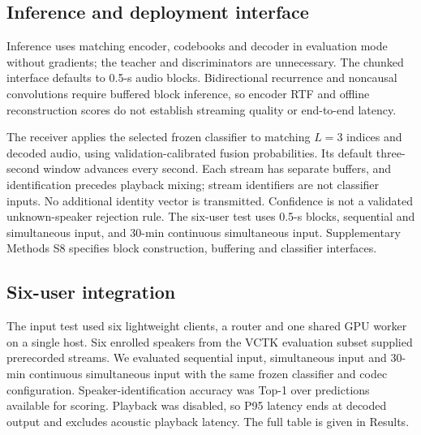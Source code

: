 \documentclass[final,5p,times,twocolumn]{elsarticle}
\begin{document}
\subsection{Inference and deployment interface}
Inference uses matching encoder, codebooks and decoder in evaluation mode without gradients; the teacher and discriminators are unnecessary. The chunked interface defaults to 0.5-s audio blocks. Bidirectional recurrence and noncausal convolutions require buffered block inference, so encoder RTF and offline reconstruction scores do not establish streaming quality or end-to-end latency.

The receiver applies the selected frozen classifier to matching $L=3$ indices and decoded audio, using validation-calibrated fusion probabilities. Its default three-second window advances every second. Each stream has separate buffers, and identification precedes playback mixing; stream identifiers are not classifier inputs. No additional identity vector is transmitted. Confidence is not a validated unknown-speaker rejection rule. The six-user test uses 0.5-s blocks, sequential and simultaneous input, and 30-min continuous simultaneous input. Supplementary Methods S8 specifies block construction, buffering and classifier interfaces.

\subsection{Six-user integration}
The input test used six lightweight clients, a router and one shared GPU worker on a single host. Six enrolled speakers from the VCTK evaluation subset supplied prerecorded streams. We evaluated sequential input, simultaneous input and 30-min continuous simultaneous input with the same frozen classifier and codec configuration. Speaker-identification accuracy was Top-1 over predictions available for scoring. Playback was disabled, so P95 latency ends at decoded output and excludes acoustic playback latency. The full table is given in Results.
\end{document}
